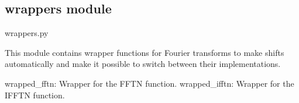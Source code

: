 \documentclass[letterpaper,10pt,english]{sphinxmanual}
\begin{document}
\begin{fulllineitems}
\label{\detokenize{source/web_interface:web_interface.index}}
\pysigstartsignatures
\pysiglinewithargsret
{}
{}
{}
\pysigstopsignatures
\end{fulllineitems}


\begin{fulllineitems}
\label{\detokenize{source/web_interface:web_interface.plot}}
\pysigstartsignatures
\pysiglinewithargsret
{}
{}
{}
\pysigstopsignatures
\end{fulllineitems}


\sphinxstepscope


\subsection{wrappers module}
\label{\detokenize{source/wrappers:module-wrappers}}\label{\detokenize{source/wrappers:wrappers-module}}\label{\detokenize{source/wrappers::doc}}
\sphinxAtStartPar
wrappers.py

\sphinxAtStartPar
This module contains wrapper functions for Fourier transforms to make shifts automatically and
make it possible to switch between their implementations.
\begin{description}
\sphinxAtStartPar
wrapped\_fftn: Wrapper for the FFTN function.
wrapped\_ifftn: Wrapper for the IFFTN function.

\end{description}

\begin{fulllineitems}
\label{\detokenize{source/wrappers:wrappers.wrapped_fft}}
\pysigstartsignatures
\pysiglinewithargsret
{}
{\sphinxparamcomma {}\sphinxparamcomma {}}
{}
\pysigstopsignatures
\end{fulllineitems}
\end{document}
